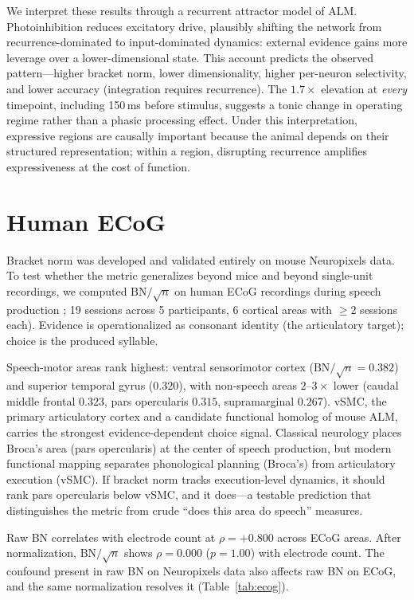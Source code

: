 \documentclass{article}
\begin{document}
We interpret these results through a recurrent attractor model of ALM. Photoinhibition reduces excitatory drive, plausibly shifting the network from recurrence-dominated to input-dominated dynamics: external evidence gains more leverage over a lower-dimensional state. This account predicts the observed pattern---higher bracket norm, lower dimensionality, higher per-neuron selectivity, and lower accuracy (integration requires recurrence). The $1.7\times$ elevation at \emph{every} timepoint, including 150\,ms before stimulus, suggests a tonic change in operating regime rather than a phasic processing effect. Under this interpretation, expressive regions are causally important because the animal depends on their structured representation; within a region, disrupting recurrence amplifies expressiveness at the cost of function.

\section{Human ECoG}
\label{sec:ecog}

Bracket norm was developed and validated entirely on mouse Neuropixels data. To test whether the metric generalizes beyond mice and beyond single-unit recordings, we computed $\text{BN}/\!\sqrt{n}$ on human ECoG recordings during speech production \citep{dandi000019}; 19 sessions across 5 participants, 6 cortical areas with $\geq 2$ sessions each). Evidence is operationalized as consonant identity (the articulatory target); choice is the produced syllable.

Speech-motor areas rank highest: ventral sensorimotor cortex ($\text{BN}/\!\sqrt{n} = 0.382$) and superior temporal gyrus ($0.320$), with non-speech areas $2$--$3\times$ lower (caudal middle frontal $0.323$, pars opercularis $0.315$, supramarginal $0.267$). vSMC, the primary articulatory cortex and a candidate functional homolog of mouse ALM, carries the strongest evidence-dependent choice signal. Classical neurology places Broca's area (pars opercularis) at the center of speech production, but modern functional mapping separates phonological planning (Broca's) from articulatory execution (vSMC). If bracket norm tracks execution-level dynamics, it should rank pars opercularis below vSMC, and it does---a testable prediction that distinguishes the metric from crude ``does this area do speech'' measures.

Raw BN correlates with electrode count at $\rho = +0.800$ across ECoG areas. After normalization, $\text{BN}/\!\sqrt{n}$ shows $\rho = 0.000$ ($p = 1.00$) with electrode count. The confound present in raw BN on Neuropixels data also affects raw BN on ECoG, and the same normalization resolves it (Table~\ref{tab:ecog}).
\end{document}
